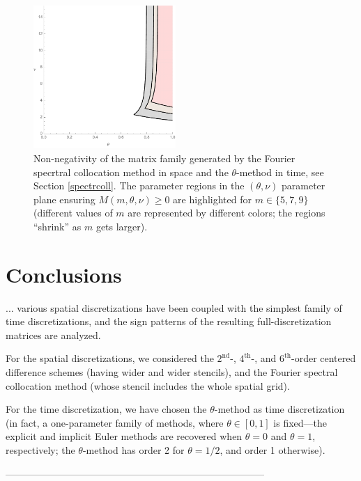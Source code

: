 \documentclass[a4paper]{article}
\newcommand{\te}{\theta}
\begin{document}
\begin{figure}
\begin{center}
\includegraphics[width=0.48\textwidth]{fig_spectral.pdf}
\caption{Non-negativity of the matrix family generated by the Fourier specrtral collocation method in space and the $\theta$-method in time, see Section \ref{spectrcoll}. The parameter regions in the $(\te,\nu)$ parameter plane ensuring $M(m,\te,\nu)\ge 0$ are highlighted for $m\in\{5, 7, 9\}$ (different values of $m$ are represented by different colors; the regions ``shrink'' as $m$ gets larger).}\label{fig_spectral}
\end{center}
\end{figure}


\section{Conclusions}\label{conclusions}

... various spatial discretizations have been coupled with the simplest family of time discretizations, and the sign patterns of the resulting full-discretization matrices are analyzed.

For the spatial discretizations, we considered the $2^\text{nd}$-, $4^\text{th}$-, and $6^\text{th}$-order centered difference schemes (having wider and wider stencils), and the Fourier spectral collocation method (whose stencil includes the whole spatial grid).

For the time discretization, we have chosen the $\theta$-method as time discretization (in fact, a one-parameter family of methods, where $\theta\in[0,1]$ is fixed---the explicit and implicit Euler methods are recovered when $\theta=0$ and $\theta=1$, respectively; the $\theta$-method has order 2 for $\theta=1/2$, and order 1 otherwise).

--------------------------------------------------------------------------------\\
\end{document}
